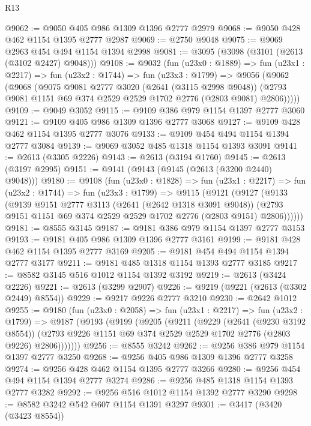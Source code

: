 \begin{lexlean}{R13}
\begin{coremodule}
@9062 := @9050 @405 @986 @1309 @1396 @2777 @2979
@9068 := @9050 @428 @462 @1154 @1395 @2777 @2987
@9069 := @2750 @9048
@9075 := @9069 @2963 @454 @494 @1154 @1394 @2998
@9081 := @3095 (@3098 (@3101 (@2613 (@3102 @2427) @9048)))
@9108 := @9032
    (fun (u23x0 : @1889) =>
    fun (u23x1 : @2217) =>
    fun (u23x2 : @1744) =>
    fun (u23x3 : @1799) =>
    @9056
      (@9062
        (@9068
          (@9075
            @9081
            @2777
            @3020
            (@2641 (@3115 @2998 @9048))
            (@2793 @9081 @1151 @69 @374 @2529 @2529 @1702 @2776 (@2803 @9081) @2806)))))
@9109 := @9049 @3052
@9115 := @9109 @386 @979 @1154 @1397 @2777 @3060
@9121 := @9109 @405 @986 @1309 @1396 @2777 @3068
@9127 := @9109 @428 @462 @1154 @1395 @2777 @3076
@9133 := @9109 @454 @494 @1154 @1394 @2777 @3084
@9139 := @9069 @3052 @485 @1318 @1154 @1393 @3091
@9141 := @2613 (@3305 @2226)
@9143 := @2613 (@3194 @1760)
@9145 := @2613 (@3197 @2995)
@9151 := @9141 (@9143 (@9145 (@2613 (@3200 @2440) @9048)))
@9180 := @9108
    (fun (u23x0 : @1828) =>
    fun (u23x1 : @2217) =>
    fun (u23x2 : @1744) =>
    fun (u23x3 : @1799) =>
    @9115
      (@9121
        (@9127
          (@9133
            (@9139
              @9151
              @2777
              @3113
              (@2641 (@2642 @1318 @3091 @9048))
              (@2793 @9151 @1151 @69 @374 @2529 @2529 @1702 @2776 (@2803 @9151) @2806))))))
@9181 := @8555 @3145
@9187 := @9181 @386 @979 @1154 @1397 @2777 @3153
@9193 := @9181 @405 @986 @1309 @1396 @2777 @3161
@9199 := @9181 @428 @462 @1154 @1395 @2777 @3169
@9205 := @9181 @454 @494 @1154 @1394 @2777 @3177
@9211 := @9181 @485 @1318 @1154 @1393 @2777 @3185
@9217 := @8582 @3145 @516 @1012 @1154 @1392 @3192
@9219 := @2613 (@3424 @2226)
@9221 := @2613 (@3299 @2907)
@9226 := @9219 (@9221 (@2613 (@3302 @2449) @8554))
@9229 := @9217 @9226 @2777 @3210
@9230 := @2642 @1012
@9255 := @9180
    (fun (u23x0 : @2058) =>
    fun (u23x1 : @2217) =>
    fun (u23x2 : @1799) =>
    @9187
      (@9193
        (@9199
          (@9205
            (@9211
              (@9229
                (@2641 (@9230 @3192 @8554))
                (@2793 @9226 @1151 @69 @374 @2529 @2529 @1702 @2776 (@2803 @9226) @2806)))))))
@9256 := @8555 @3242
@9262 := @9256 @386 @979 @1154 @1397 @2777 @3250
@9268 := @9256 @405 @986 @1309 @1396 @2777 @3258
@9274 := @9256 @428 @462 @1154 @1395 @2777 @3266
@9280 := @9256 @454 @494 @1154 @1394 @2777 @3274
@9286 := @9256 @485 @1318 @1154 @1393 @2777 @3282
@9292 := @9256 @516 @1012 @1154 @1392 @2777 @3290
@9298 := @8582 @3242 @542 @607 @1154 @1391 @3297
@9301 := @3417 (@3420 (@3423 @8554))

\end{coremodule}
\end{lexlean}
